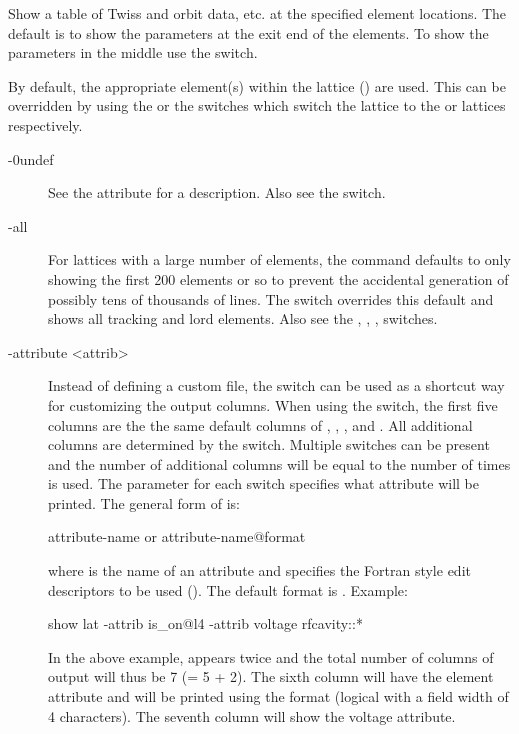 {{{{{{{{{Show a table of Twiss and orbit data, etc. at the specified element locations. The default is to
show the parameters at the exit end of the elements. To show the parameters in the middle use the
 switch.

By default, the appropriate element(s) within the  lattice () are
used. This can be overridden by using the  or the  switches which switch the
lattice to the  or  lattices respectively.

\begin{description}
\item[-0undef] \Newline
See the  attribute for a description. Also see the  switch.
%
\item[-all] \Newline
For lattices with a large number of elements, the  command defaults to only showing
the first 200 elements or so to prevent the accidental generation of possibly tens of thousands of
lines. The  switch overrides this default and shows all tracking and lord elements. Also
see the , , ,  switches.
%
\item[-attribute <attrib>] \Newline
Instead of defining a custom file, the  switch can be used as a shortcut way
for customizing the output columns.  When using the  switch, the first five columns
are the the same default columns of , , ,  and
. All additional columns are determined by the  switch. Multiple
 switches can be present and the number of additional columns will be equal to the
number of times  is used.  The  parameter for each 
switch specifies what attribute will be printed.  The general form of  is:
\begin{example}
  attribute-name         or
  attribute-name@format
\end{example}
where  is the name of an attribute and  specifies the Fortran style
edit descriptors to be used (). The default format is .  Example:
\begin{example}
  show lat -attrib is_on@l4 -attrib voltage rfcavity::*
\end{example}
In the above example,  appears twice and the total number of columns of output will
thus be 7 (= 5 + 2). The sixth column will have the  element attribute and will be printed
using the  format (logical with a field width of 4 characters). The seventh column will show
the voltage attribute.


\end{description}}}}}}}}}}

